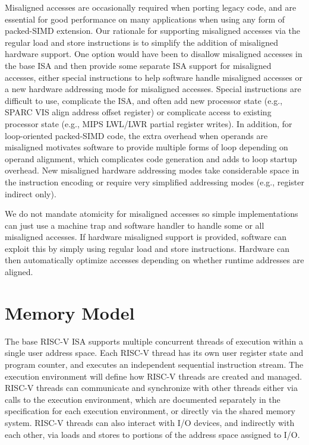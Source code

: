 \begin{commentary}
Misaligned accesses are occasionally required when porting legacy
code, and are essential for good performance on many applications when
using any form of packed-SIMD extension.  Our rationale for supporting
misaligned accesses via the regular load and store instructions is to
simplify the addition of misaligned hardware support.  One option
would have been to disallow misaligned accesses in the base ISA and
then provide some separate ISA support for misaligned accesses, either
special instructions to help software handle misaligned accesses or a
new hardware addressing mode for misaligned accesses.  Special
instructions are difficult to use, complicate the ISA, and often add
new processor state (e.g., SPARC VIS align address offset register) or
complicate access to existing processor state (e.g., MIPS LWL/LWR
partial register writes).  In addition, for loop-oriented packed-SIMD
code, the extra overhead when operands are misaligned motivates
software to provide multiple forms of loop depending on operand
alignment, which complicates code generation and adds to loop startup
overhead.  New misaligned hardware addressing modes take considerable
space in the instruction encoding or require very simplified
addressing modes (e.g., register indirect only).

We do not mandate atomicity for misaligned accesses so simple
implementations can just use a machine trap and software handler to
handle some or all misaligned accesses.  If hardware misaligned support is
provided, software can exploit this by simply using regular load and
store instructions.  Hardware can then automatically optimize accesses
depending on whether runtime addresses are aligned.
\end{commentary}

\section{Memory Model}

The base RISC-V ISA supports multiple concurrent threads of execution
within a single user address space.  Each RISC-V thread has its own
user register state and program counter, and executes an independent
sequential instruction stream.  The execution environment will define
how RISC-V threads are created and managed.  RISC-V threads can
communicate and synchronize with other threads either via calls to the
execution environment, which are documented separately in the
specification for each execution environment, or directly via the
shared memory system.  RISC-V threads can also interact with I/O
devices, and indirectly with each other, via loads and stores to
portions of the address space assigned to I/O.

